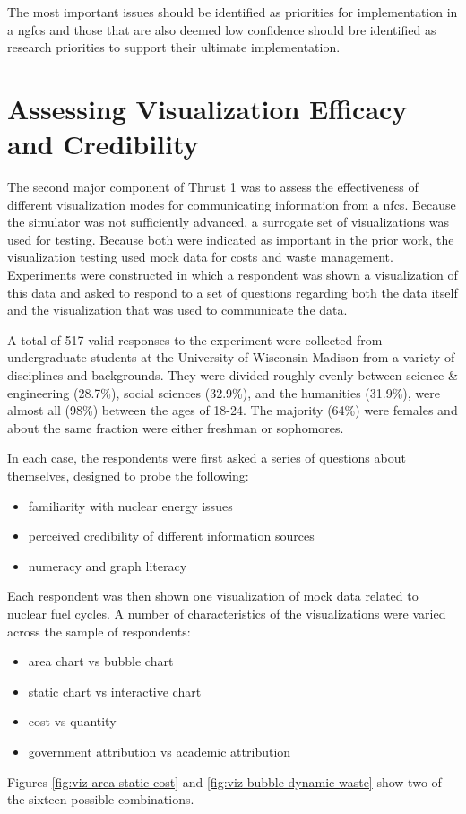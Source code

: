 The most important issues should be identified as priorities for
implementation in a \gls{ngfcs} and those that are also deemed low confidence
should bre identified as research priorities to support their ultimate
implementation.

\section{Assessing Visualization Efficacy and Credibility} %

The second major component of Thrust 1 was to assess the effectiveness of
different visualization modes for communicating information from a \gls{nfcs}.
Because the \Cyclus simulator was not sufficiently advanced, a surrogate set
of visualizations was used for testing.  Because both were indicated as
important in the prior work, the visualization testing used mock data for
costs and waste management.  Experiments were constructed in which a
respondent was shown a visualization of this data and asked to respond to a
set of questions regarding both the data itself and the visualization that was
used to communicate the data.

A total of 517 valid responses to the experiment were collected from
undergraduate students at the University of Wisconsin-Madison from a variety
of disciplines and backgrounds.  They were divided roughly evenly between
science \& engineering (28.7\%), social sciences (32.9\%), and the humanities
(31.9\%), were almost all (98\%) between the ages of 18-24.  The majority
(64\%) were females and about the same fraction were either freshman or
sophomores.

In each case, the respondents were first asked a series of questions about
themselves, designed to probe the following:
\begin{itemize}
\item familiarity with nuclear energy issues
\item perceived credibility of different information sources
\item numeracy and graph literacy
\end{itemize}

Each respondent was then shown one visualization of mock data related to
nuclear fuel cycles.  A number of characteristics of the visualizations were
varied across the sample of respondents:
\begin{itemize}
\item area chart vs bubble chart
\item static chart vs interactive chart
\item cost vs quantity
\item government attribution vs academic attribution
\end{itemize}
Figures \ref{fig:viz-area-static-cost} and \ref{fig:viz-bubble-dynamic-waste}
show two of the sixteen possible combinations.

